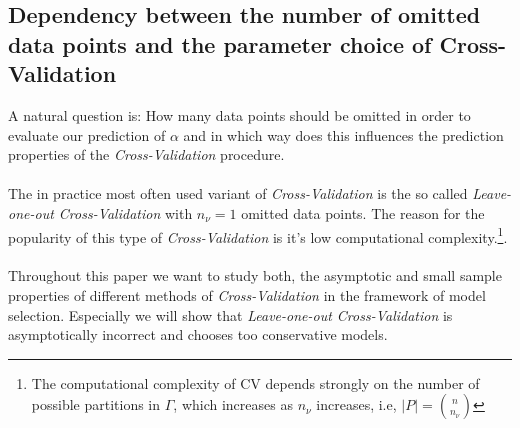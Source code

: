 \documentclass[Research_Module_ES.tex]{subfiles}
\begin{document}
\subsection{Dependency between the number of omitted data points and the  parameter choice of Cross-Validation}
A natural question is: How many data points should be omitted in order to evaluate our prediction of $\alpha$ and in which way does this influences the prediction properties of the \textit{Cross-Validation} procedure.\\
\\
The in practice most often used variant of \textit{Cross-Validation} is the so called \textit{ Leave-one-out Cross-Validation} with $n_\nu=1$ omitted data points. The reason for the popularity of this type of \textit{Cross-Validation} is it's low computational complexity.\footnote{The computational complexity of CV depends strongly on the number of possible partitions in $\Gamma$, which increases as $n_\nu$ increases, i.e, $|P|=\binom{n}{n_\nu}$}.\\
\\
Throughout this paper we want to study both, the asymptotic and small sample properties of different methods of \textit{Cross-Validation} in the framework of model selection. Especially we will show that \textit{ Leave-one-out Cross-Validation} is asymptotically incorrect and chooses too conservative models.\\
\end{document}
